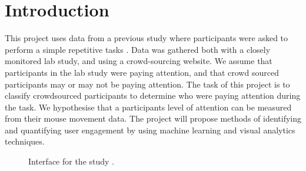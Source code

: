 \documentclass{article}
\begin{document}



\section{Introduction}

This project uses data from a previous study where participants were asked to perform a simple repetitive tasks \cite{tom2018risk}.
Data was gathered both with a closely monitored lab study, and using a crowd-sourcing website.
We assume that participants in the lab study were paying attention, and that crowd sourced participants may or may not be paying attention.
The task of this project is to classify crowdsourced participants to determine who were paying attention during the task.
We hypothesise that a participants level of attention can be measured from their mouse movement data.
The project will propose methods of identifying and quantifying user engagement by using machine learning and visual analytics techniques.


\begin{figure}[ht]
    \centering
    \centerline{
    }
    \caption{Interface for the study \cite{tom2018risk}.}
    \label{fig:interface}
\end{figure}
\end{document}

